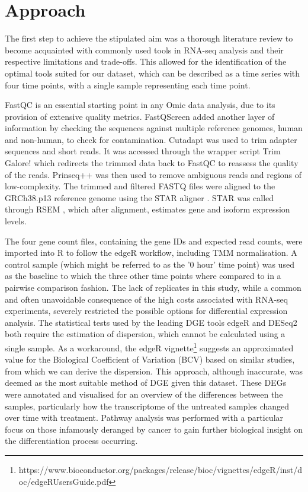 
\section{Approach}
The first step to achieve the stipulated aim was a thorough literature review to become acquainted with commonly used tools in RNA-seq analysis and their respective limitations and trade-offs. This allowed for the identification of the optimal tools suited for our dataset, which can be described as a time series with four time points, with a single sample representing each time point. 

FastQC is an essential starting point in any Omic data analysis, due to its provision of extensive quality metrics. FastQScreen \citep{wingett2018fastq} added another layer of information by checking the sequences against multiple reference genomes, human and non-human, to check for contamination. Cutadapt \citep{martin2011cutadapt} was used to trim adapter sequences and short reads. It was accessed through the wrapper script Trim Galore! \citep{trimgalore} which redirects the trimmed data back to FastQC to reassess the quality of the reads. Prinseq++ \citep{prinseq++} was then used to remove ambiguous reads and regions of low-complexity. The trimmed and filtered FASTQ files were aligned to the GRCh38.p13 reference genome \citep{ref} using the \ac{STAR} aligner \citep{Dobin2013}. \ac{STAR} was called through RSEM \citep{li2011rsem}, which after alignment, estimates gene and isoform expression levels. 

The four gene count files, containing the gene IDs and expected read counts, were imported into R \citep{R} to follow the edgeR \citep{edger} workflow, including \ac{TMM} normalisation. A control sample (which might be referred to as the '0 hour' time point) was used as the baseline to which the three other time points where compared to in a pairwise comparison fashion. The lack of replicates in this study, while a common and often unavoidable consequence of the high costs associated with RNA-seq experiments, severely restricted the possible options for differential expression analysis. The statistical tests used by the leading \ac{DGE} tools edgeR and DESeq2 \citep{love2014moderated} both require the estimation of dispersion, which cannot be calculated using a single sample. As a workaround, the edgeR vignette\footnote{https://www.bioconductor.org/packages/release/bioc/vignettes/edgeR/inst/doc/edgeRUsersGuide.pdf} suggests an approximated value for the Biological Coefficient of Variation (BCV) based on similar studies, from which we can derive the dispersion. This approach, although inaccurate, was deemed as the most suitable method of \ac{DGE} given this dataset. These \ac{DEG}s were annotated and visualised for an overview of the differences between the samples, particularly how the transcriptome of the untreated samples changed over time with treatment. Pathway analysis was performed with a particular focus on those infamously deranged by cancer to gain further biological insight on the differentiation process occurring.

